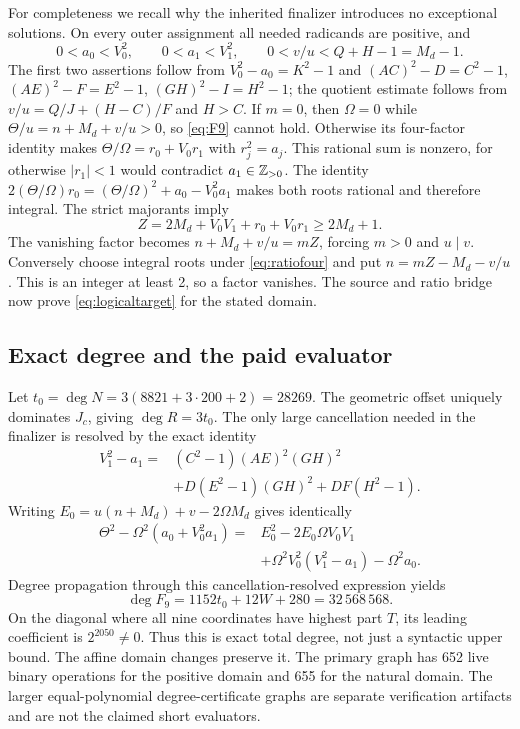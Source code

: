 For completeness we recall why the inherited finalizer introduces no
exceptional solutions. On every outer assignment all needed radicands
are positive, and
\[
0<a_0<V_0^2,\qquad 0<a_1<V_1^2,\qquad
0<v/u<Q+H-1=M_d-1.
\]
The first two assertions follow from
$V_0^2-a_0=K^2-1$ and
$(AC)^2-D=C^2-1$, $(AE)^2-F=E^2-1$,
$(GH)^2-I=H^2-1$; the quotient estimate follows from
$v/u=Q/J+(H-C)/F$ and $H>C$.
If $m=0$, then $\Omega=0$ while $\Theta/u=n+M_d+v/u>0$,
so \eqref{eq:F9} cannot hold.
Otherwise its four-factor identity makes
$\Theta/\Omega=r_0+V_0r_1$ with $r_j^2=a_j$.
This rational sum is nonzero, for otherwise $|r_1|<1$ would contradict
$a_1\in\mathbb Z_{>0}$. The identity
$2(\Theta/\Omega)r_0=(\Theta/\Omega)^2+a_0-V_0^2a_1$
makes both roots rational and therefore integral.
The strict majorants imply
\[
 Z=2M_d+V_0V_1+r_0+V_0r_1\ge2M_d+1.
\]
The vanishing factor becomes $n+M_d+v/u=mZ$, forcing $m>0$
and $u\mid v$. Conversely choose integral roots under
\eqref{eq:ratiofour} and put $n=mZ-M_d-v/u$. This is an integer
at least 2, so a factor vanishes. The source and ratio bridge now prove
\eqref{eq:logicaltarget} for the stated domain.

\subsection{Exact degree and the paid evaluator}
Let $t_0=\deg N=3(8821+3\cdot200+2)=28269$.
The geometric offset uniquely dominates $J_c$, giving
$\deg R=3t_0$. The only large cancellation needed in the finalizer is
resolved by the exact identity
\begin{align*}
 V_1^2-a_1={}&(C^2-1)(AE)^2(GH)^2\\
 &+D(E^2-1)(GH)^2+DF(H^2-1).
\end{align*}
Writing $E_0=u(n+M_d)+v-2\Omega M_d$ gives identically
\begin{align*}
\Theta^2-\Omega^2(a_0+V_0^2a_1)
={}&E_0^2-2E_0\Omega V_0V_1\\
 &+\Omega^2V_0^2(V_1^2-a_1)-\Omega^2a_0.
\end{align*}
Degree propagation through this cancellation-resolved expression yields
\[
\deg F_9=1152t_0+12W+280=32\,568\,568.
\]
On the diagonal where all nine coordinates have highest part $T$,
its leading coefficient is $2^{2050}\ne0$. Thus this is exact total
degree, not just a syntactic upper bound. The affine domain changes
preserve it. The primary graph has 652 live binary operations for the
positive domain and 655 for the natural domain. The larger equal-polynomial
degree-certificate graphs are separate verification artifacts and are not
the claimed short evaluators.

